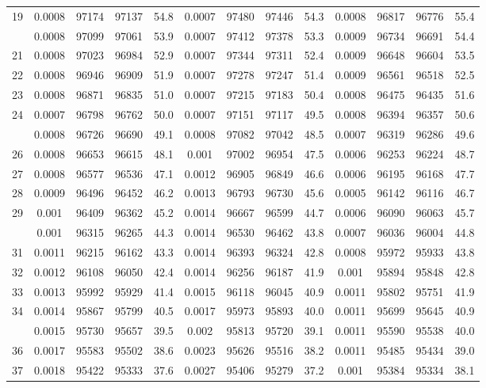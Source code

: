 \documentclass[
  14pt,
]{article}
\begin{document}
\begin{longtable}[t]{lcccccccccccc}
19 & 0.0008 & 97174 & 97137 & 54.8 & 0.0007 & 97480 & 97446 & 54.3 & 0.0008 & 96817 & 96776 & 55.4\\
\addlinespace
20 & 0.0008 & 97099 & 97061 & 53.9 & 0.0007 & 97412 & 97378 & 53.3 & 0.0009 & 96734 & 96691 & 54.4\\
21 & 0.0008 & 97023 & 96984 & 52.9 & 0.0007 & 97344 & 97311 & 52.4 & 0.0009 & 96648 & 96604 & 53.5\\
22 & 0.0008 & 96946 & 96909 & 51.9 & 0.0007 & 97278 & 97247 & 51.4 & 0.0009 & 96561 & 96518 & 52.5\\
23 & 0.0008 & 96871 & 96835 & 51.0 & 0.0007 & 97215 & 97183 & 50.4 & 0.0008 & 96475 & 96435 & 51.6\\
24 & 0.0007 & 96798 & 96762 & 50.0 & 0.0007 & 97151 & 97117 & 49.5 & 0.0008 & 96394 & 96357 & 50.6\\
\addlinespace
25 & 0.0008 & 96726 & 96690 & 49.1 & 0.0008 & 97082 & 97042 & 48.5 & 0.0007 & 96319 & 96286 & 49.6\\
26 & 0.0008 & 96653 & 96615 & 48.1 & 0.001 & 97002 & 96954 & 47.5 & 0.0006 & 96253 & 96224 & 48.7\\
27 & 0.0008 & 96577 & 96536 & 47.1 & 0.0012 & 96905 & 96849 & 46.6 & 0.0006 & 96195 & 96168 & 47.7\\
28 & 0.0009 & 96496 & 96452 & 46.2 & 0.0013 & 96793 & 96730 & 45.6 & 0.0005 & 96142 & 96116 & 46.7\\
29 & 0.001 & 96409 & 96362 & 45.2 & 0.0014 & 96667 & 96599 & 44.7 & 0.0006 & 96090 & 96063 & 45.7\\
\addlinespace
30 & 0.001 & 96315 & 96265 & 44.3 & 0.0014 & 96530 & 96462 & 43.8 & 0.0007 & 96036 & 96004 & 44.8\\
31 & 0.0011 & 96215 & 96162 & 43.3 & 0.0014 & 96393 & 96324 & 42.8 & 0.0008 & 95972 & 95933 & 43.8\\
32 & 0.0012 & 96108 & 96050 & 42.4 & 0.0014 & 96256 & 96187 & 41.9 & 0.001 & 95894 & 95848 & 42.8\\
33 & 0.0013 & 95992 & 95929 & 41.4 & 0.0015 & 96118 & 96045 & 40.9 & 0.0011 & 95802 & 95751 & 41.9\\
34 & 0.0014 & 95867 & 95799 & 40.5 & 0.0017 & 95973 & 95893 & 40.0 & 0.0011 & 95699 & 95645 & 40.9\\
\addlinespace
35 & 0.0015 & 95730 & 95657 & 39.5 & 0.002 & 95813 & 95720 & 39.1 & 0.0011 & 95590 & 95538 & 40.0\\
36 & 0.0017 & 95583 & 95502 & 38.6 & 0.0023 & 95626 & 95516 & 38.2 & 0.0011 & 95485 & 95434 & 39.0\\
37 & 0.0018 & 95422 & 95333 & 37.6 & 0.0027 & 95406 & 95279 & 37.2 & 0.001 & 95384 & 95334 & 38.1\\

\end{longtable}
\end{document}
